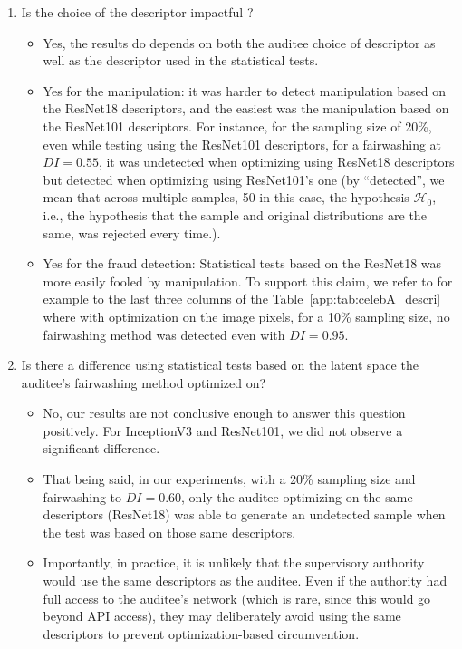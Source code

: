\documentclass[runningheads, orivec]{llncs}
\begin{document}
\begin{enumerate}
    \item Is the choice of the descriptor impactful ?
    \begin{itemize}
        \item Yes, the results do depends on both the auditee choice of descriptor as well as the descriptor used in the statistical tests.
        \item Yes for the manipulation: it was harder to detect manipulation based on the ResNet18 descriptors, and the easiest was the manipulation based on the ResNet101 descriptors. For instance, for the sampling size of 20\%, even while testing using the ResNet101 descriptors, for a fairwashing at $DI=0.55$, it was undetected when optimizing using ResNet18 descriptors but detected when optimizing using ResNet101's one (by ``detected'', we mean that across multiple samples, 50 in this case, the  hypothesis $\mathcal{H}_0$, i.e., the hypothesis that the sample and original distributions are the same, was rejected every time.). %
        \item Yes for the fraud detection: Statistical tests based on the ResNet18 was more easily fooled by manipulation. To support this claim, we refer to for example to the last three columns of the Table~\ref{app:tab:celebA_descri} where with optimization on the image pixels, for a 10\% sampling size, no fairwashing method was detected even with $DI=0.95$.
    \end{itemize}

    \item Is there a difference using statistical tests based on the latent space the auditee's fairwashing method optimized on?
    \begin{itemize}
        \item No, our results are not conclusive enough to answer this question positively. For InceptionV3 and ResNet101, we did not observe a significant difference.
        \item That being said, in our experiments, with a 20\% sampling size and fairwashing to $DI=0.60$, only the auditee optimizing on the same descriptors (ResNet18) was able to generate an undetected sample when the test was based on those same descriptors.

        \item Importantly, in practice, it is unlikely that the supervisory authority would use the same descriptors as the auditee. Even if the authority had full access to the auditee's network (which is rare, since this would go beyond API access), they may deliberately avoid using the same descriptors to prevent optimization-based circumvention.
    \end{itemize}
\end{enumerate}
\end{document}
